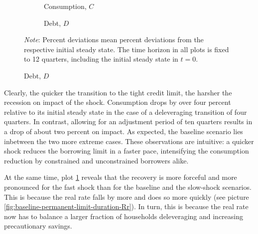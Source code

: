\documentclass[12pt]{article} %
\numberwithin{equation}{section} %
\numberwithin{figure}{section}
\numberwithin{table}{section}
\begin{document}
\begin{figure}[ht]
    \centering
    \caption{Baseline Model -- Varying Durations of a Credit Crunch}
    \label{fig:baseline-permanent-limit-duration}
     \begin{subfigure}[b]{0.49\textwidth}
     \caption{Consumption, $C$}
     \label{fig:baseline-permanent-limit-duration-C}
         \centering
         
     \end{subfigure}
     \hfill
     \begin{subfigure}[b]{0.49\textwidth}
     \caption{Debt, $D$}
     \label{fig:baseline-permanent-limit-duration-D}
         \centering
         
     \end{subfigure}

    \vspace{10pt}
     
     \justifying
     \footnotesize
	\textit{Note}: Percent deviations mean percent deviations from the respective initial steady state. The time horizon in all plots is fixed to 12 quarters, including the initial steady state in $t=0$.
\end{figure}

Clearly, the quicker the transition to the tight credit limit, the harsher the recession on impact of the shock. Consumption drops by over four percent relative to its initial steady state in the case of a deleveraging transition of four quarters. In contrast, allowing for an adjustment period of ten quarters results in a drop of about two percent on impact. As expected, the baseline scenario lies inbetween the two more extreme cases. These observations are intuitive: a quicker shock reduces the borrowing limit in a faster pace, intensifying the consumption reduction by constrained and unconstrained borrowers alike. 

At the same time, plot \ref{fig:baseline-permanent-limit-duration-C} reveals that the recovery is more forceful and more pronounced for the fast shock than for the baseline and the slow-shock scenarios. This is because the real rate falls by more and does so more quickly (see picture \ref{fig:baseline-permanent-limit-duration-Rr}). In turn, this is because the real rate now has to balance a larger fraction of households deleveraging and increasing precautionary savings.
\end{document}
